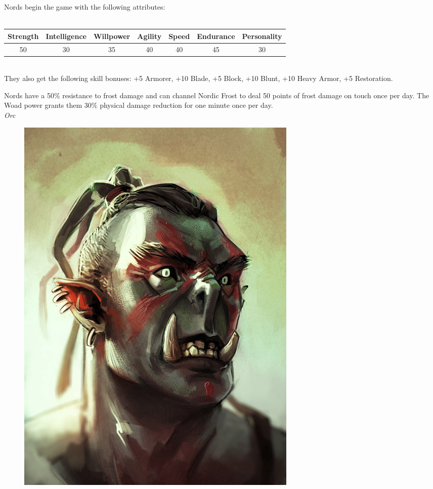 \documentclass[12pt]{article}
\begin{document}
Nords begin the game with the following attributes:\\~\\
\begin{tabular}{|c|c|c|c|c|c|c|}
\hline
Strength & Intelligence & Willpower & Agility & Speed & Endurance & Personality\\ \hline
50 & 30 & 35 & 40 & 40 & 45 & 30\\ \hline

\end{tabular}\\

They also get the following skill bonuses: +5 Armorer, +10 Blade, +5 Block, +10 Blunt, +10 Heavy Armor, +5 Restoration.

Nords have a 50\% resistance to frost damage and can channel Nordic Frost to deal 50 points of frost damage on touch once per day. The Woad power grants them 30\% physical damage reduction for one minute once per day.\\

\noindent
\textit{Orc}
\begin{figure}
	\includegraphics[width=\textwidth]{Orc.png}
\end{figure}
\end{document}

